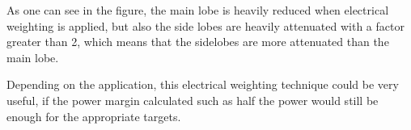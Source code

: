 As one can see in the figure, the main lobe is heavily reduced when electrical weighting is applied, but also the side lobes are heavily attenuated with a factor greater than 2, which means that the sidelobes are more attenuated than the main lobe.

Depending on the application, this electrical weighting technique could be very useful, if the power margin calculated such as half the power would still be enough for the appropriate targets.


